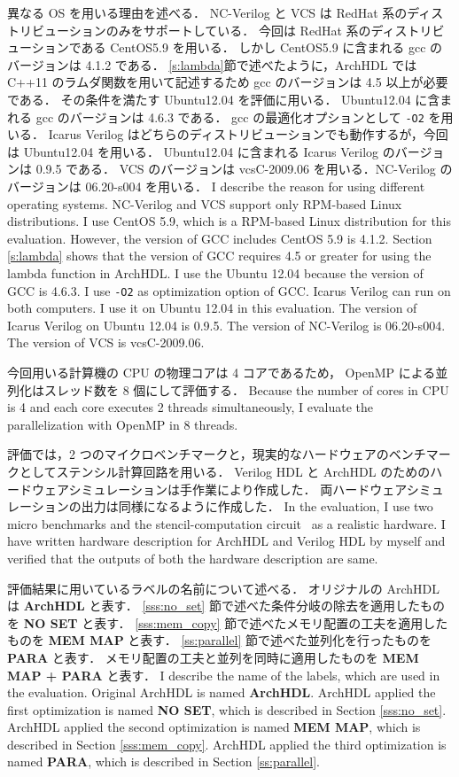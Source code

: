 異なる OS を用いる理由を述べる．
NC-Verilog と VCS は RedHat 系のディストリビューションのみをサポートしている．
今回は RedHat 系のディストリビューションである CentOS5.9 を用いる．
しかし CentOS5.9 に含まれる gcc のバージョンは 4.1.2 である．
\ref{s:lambda}節で述べたように，ArchHDL では C++11 のラムダ関数を用いて記述するため gcc のバージョンは 4.5 以上が必要である．
その条件を満たす Ubuntu12.04 を評価に用いる．
Ubuntu12.04 に含まれる gcc のバージョンは 4.6.3 である．
gcc の最適化オプションとして \verb/-O2/ を用いる．
Icarus Verilog はどちらのディストリビューションでも動作するが，今回は Ubuntu12.04 を用いる．
Ubuntu12.04 に含まれる Icarus Verilog のバージョンは 0.9.5 である．
VCS のバージョンは vcsC-2009.06 を用いる．NC-Verilog のバージョンは 06.20-s004 を用いる．
\fi
I describe the reason for using different operating systems.
NC-Verilog and VCS support only RPM-based Linux distributions.
I use CentOS 5.9, which is a RPM-based Linux distribution for this evaluation.
However, the version of GCC includes CentOS 5.9 is 4.1.2.
Section \ref{s:lambda} shows that the version of GCC requires 4.5 or greater for using the lambda function in ArchHDL.
I use the Ubuntu 12.04 because the version of GCC is 4.6.3.
I use \verb/-O2/ as optimization option of GCC.
Icarus Verilog can run on both computers.
I use it on Ubuntu 12.04 in this evaluation.
The version of Icarus Verilog on Ubuntu 12.04 is 0.9.5.
The version of NC-Verilog is 06.20-s004.
The version of VCS is vcsC-2009.06.

今回用いる計算機の CPU の物理コアは 4 コアであるため， OpenMP による並列化はスレッド数を 8 個にして評価する．
\fi
Because the number of cores in CPU is 4 and each core executes 2 threads simultaneously,
I evaluate the parallelization with OpenMP in 8 threads.

評価では，2 つのマイクロベンチマークと，現実的なハードウェアのベンチマークとしてステンシル計算回路\cite{koba:stencil}を用いる．
Verilog HDL と ArchHDL のためのハードウェアシミュレーションは手作業により作成した．
両ハードウェアシミュレーションの出力は同様になるように作成した．
\fi
In the evaluation, I use two micro benchmarks
and the stencil-computation circuit~\cite{koba:stencil} as a realistic hardware.
I have written hardware description for ArchHDL and Verilog HDL by myself
and verified that the outputs of both the hardware description are same.

評価結果に用いているラベルの名前について述べる．
オリジナルの ArchHDL は \textbf{ArchHDL} と表す．
\ref{sss:no_set} 節で述べた条件分岐の除去を適用したものを \textbf{NO SET} と表す．
\ref{sss:mem_copy} 節で述べたメモリ配置の工夫を適用したものを \textbf{MEM MAP} と表す．
\ref{ss:parallel} 節で述べた並列化を行ったものを \textbf{PARA} と表す．
メモリ配置の工夫と並列を同時に適用したものを \textbf{MEM MAP + PARA} と表す．
\fi
I describe the name of the labels, which are used in the evaluation.
Original ArchHDL is named \textbf{ArchHDL}.
ArchHDL applied the first optimization is named \textbf{NO SET}, which is described in Section \ref{sss:no_set}.
ArchHDL applied the second optimization is named \textbf{MEM MAP}, which is described in Section \ref{sss:mem_copy}.
ArchHDL applied the third optimization is named \textbf{PARA}, which is described in Section \ref{ss:parallel}.


